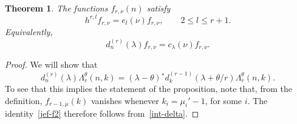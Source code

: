 \documentclass[pdftex]{sigma}
\newtheorem{thm}{Theorem}[section]
\theoremstyle{definition}
\begin{document}
\begin{thm}\label{jef-f}
The functions $f_{r,\nu}(n)$ satisfy
\begin{equation}
h^{r,l} f_{r,\nu} = e_l(\nu) f_{r,\nu}, \qquad 2\le l\le r+1.
\end{equation}
Equivalently,
\begin{equation}\label{jef-f2} d^{(r)}_n(\lambda) f_{r,\nu}= c_\lambda(\nu) f_{r,\nu}.\end{equation}
 \end{thm}
\begin{proof}
We will show that
\begin{equation}\label{int-delta} d^{(r)}_n(\lambda) \Lambda_r^\theta(n,k)
= (\lambda-\theta) {}^*\! d^{(r-1)}_k(\lambda+\theta/r) \Lambda_r^\theta(n,k).\end{equation}
To see that this implies the statement of the proposition, note that,
from the definition, $f_{r-1,\mu} (k)$ vanishes whenever $k_i=\mu_i'-1$, for some $i$.
The identity~\eqref{jef-f2} therefore follows from~\eqref{int-delta}.


\end{proof}
\end{document}
